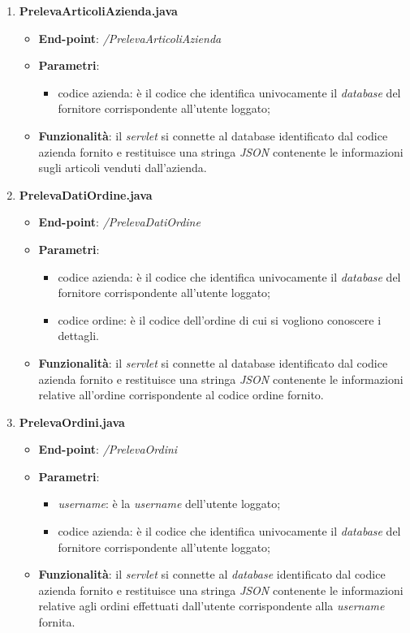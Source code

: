\documentclass[12pt, a4paper, titlepage]{report}
\begin{document}
\begin{enumerate}
		\item \textbf{PrelevaArticoliAzienda.java}
		\begin{itemize}
			\item \textbf{End-point}: \textit{/PrelevaArticoliAzienda}
			\item \textbf{Parametri}:
			\begin{itemize}
				\item codice azienda: è il codice che identifica univocamente il \textit{database} del fornitore corrispondente all'utente loggato;
			\end{itemize}
			\item \textbf{Funzionalità}: il \textit{servlet} si connette al database identificato dal codice azienda fornito e restituisce una stringa \textit{JSON} contenente le informazioni sugli articoli venduti dall'azienda.
		\end{itemize}
	
		\item \textbf{PrelevaDatiOrdine.java}
		\begin{itemize}
			\item \textbf{End-point}: \textit{/PrelevaDatiOrdine}
			\item \textbf{Parametri}:
			\begin{itemize}
				\item codice azienda: è il codice che identifica univocamente il \textit{database} del fornitore corrispondente all'utente loggato;
				\item codice ordine: è il codice dell'ordine di cui si vogliono conoscere i dettagli.
			\end{itemize}
			\item \textbf{Funzionalità}: il \textit{servlet} si connette al database identificato dal codice azienda fornito e restituisce una stringa \textit{JSON} contenente le informazioni relative all'ordine corrispondente al codice ordine fornito.
		\end{itemize}
	
		\item \textbf{PrelevaOrdini.java}
		\begin{itemize}
			\item \textbf{End-point}: \textit{/PrelevaOrdini}
			\item \textbf{Parametri}:
			\begin{itemize}
				\item \textit{username}: è la \textit{username} dell'utente loggato;
				\item codice azienda: è il codice che identifica univocamente il \textit{database} del fornitore corrispondente all'utente loggato;
			\end{itemize}
			\item \textbf{Funzionalità}: il \textit{servlet} si connette al \textit{database} identificato dal codice azienda fornito e restituisce una stringa \textit{JSON} contenente le informazioni relative agli ordini effettuati dall'utente corrispondente alla \textit{username} fornita.
		\end{itemize}
	

\end{enumerate}
\end{document}
